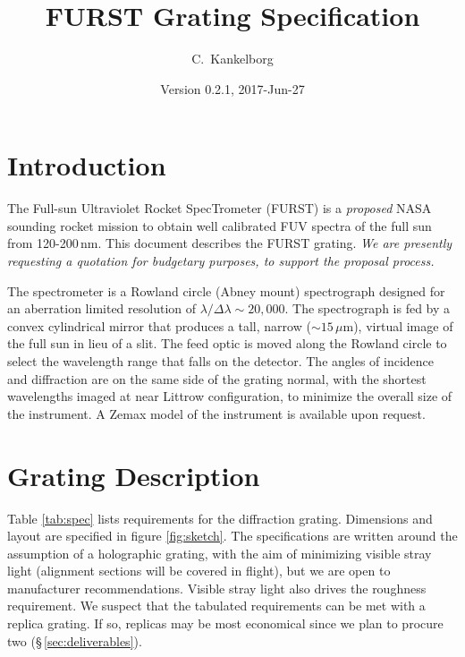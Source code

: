 \documentclass[12pt]{article}
\title{FURST Grating Specification}
\date{Version 0.2.1, 2017-Jun-27}
\author{C.\ Kankelborg}
\begin{document}
\maketitle

\section{Introduction}

The Full-sun Ultraviolet Rocket SpecTrometer (FURST) is a \emph{proposed} NASA sounding rocket mission to obtain well calibrated FUV spectra of the full sun from 120-200\,nm. This document describes the FURST grating. \emph{We are presently requesting a quotation for budgetary purposes, to support the proposal process.}

The spectrometer is a Rowland circle (Abney mount) spectrograph designed for an aberration limited resolution of $\lambda / \Delta\lambda \sim 20,000$. The spectrograph is fed by a convex cylindrical mirror that produces a tall, narrow ($\sim 15\,\mu$m), virtual image of the full sun in lieu of a slit. The feed optic is moved along the Rowland circle to select the wavelength range that falls on the detector. The angles of incidence and diffraction are on the same side of the grating normal, with the shortest wavelengths imaged at near Littrow configuration, to minimize the overall size of the instrument. A Zemax model of the instrument is available upon request.

\section{Grating Description}
Table \ref{tab:spec} lists requirements for the diffraction grating. Dimensions and layout are specified in figure \ref{fig:sketch}. 
The specifications are written around the assumption of a holographic grating, with the aim of minimizing visible stray light (alignment sections will be covered in flight), but we are open to manufacturer recommendations. Visible stray light also drives the roughness requirement. We suspect that the tabulated requirements can be met with a replica grating. If so, replicas may be most economical since we plan to procure two (\S\,\ref{sec:deliverables}).
\end{document}
